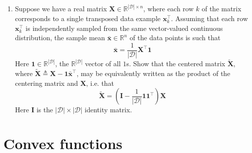 \documentclass{article}
\numberwithin{equation}{section}
\begin{document}
\begin{enumerate}
    \item
    Suppose we have a real matrix $ \mathbf{X} \in
    \mathbb{R}^{|\mathcal{D}| \times n} $, where each row $ k $ of the matrix
    corresponds to a single transposed data example $ \mathbf{x}_k^\top $.
    Assuming that each row $ \mathbf{x}_k^\top $ is independently sampled from
    the same vector-valued continuous distribution, the sample mean
    $ \bar{\mathbf{x}} \in \mathbb{R}^n $ of the data points is such that
    \begin{equation*}
        \bar{\mathbf{x}} = \frac{1}{|\mathcal{D}|}\mathbf{X}^\top\mathbf{1}
    \end{equation*}
    Here $ \mathbf{1} \in \mathbb{R}^{|\mathcal{D}|} $, the
    $ \mathbb{R}^{|\mathcal{D}|} $ vector of all $ 1 $s. Show that the centered
    matrix $ \tilde{\mathbf{X}} $, where $ \tilde{\mathbf{X}} \triangleq
    \mathbf{X} - \mathbf{1}\bar{\mathbf{x}}^\top $, may be equivalently written
    as the product of the centering matrix and $ \mathbf{X} $, i.e. that
    \begin{equation*}
        \tilde{\mathbf{X}} = \left(\mathbf{I} - \frac{1}{|\mathcal{D}|}
        \mathbf{11}^\top\right)\mathbf{X}
    \end{equation*}
    Here $ \mathbf{I} $ is the $ |\mathcal{D}| \times |\mathcal{D}| $ identity
    matrix.
\end{enumerate}

\section{Convex functions}
\end{document}
